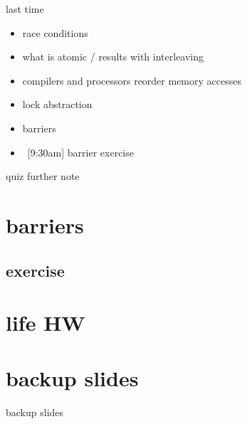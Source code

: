 \date{}
\title{}
\date{}

\begin{frame}
    \titlepage
\end{frame}



\begin{frame}{last time}
    \begin{itemize}
    \item race conditions
    \item what is atomic / results with interleaving
    \item compilers and processors reorder memory accesses
    \item lock abstraction
    \item barriers
    \item{}~[9:30am] barrier exercise
    \end{itemize}
\end{frame}

\begin{frame}{quiz further note}
\end{frame}

\section{barriers}


\subsection{exercise}


\section{life HW}







\section{backup slides}
\begin{frame}{backup slides}
\end{frame}







